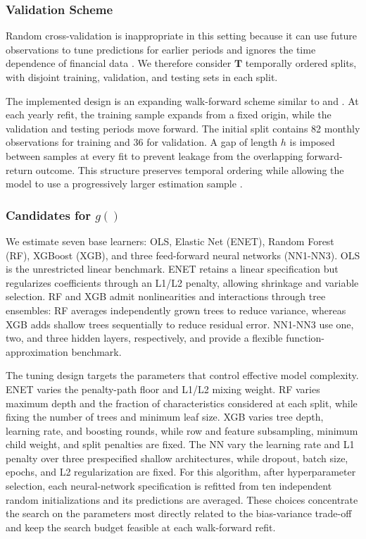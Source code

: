 \documentclass[preprint,12pt,authoryear]{elsarticle}
\begin{document}
\subsubsection{Validation Scheme} \label{valshceme}
Random cross-validation is inappropriate in this setting because it can use future observations to tune predictions for earlier periods and ignores the time dependence of financial data \citep{schnaubelt2019, bergmeiretal2018}. We therefore consider $\mathbf{T}$ temporally ordered splits, with disjoint training, validation, and testing sets in each split.

The implemented design is an expanding walk-forward scheme similar to \citet{hanauerkalsbach2023} and \citet{gukellyxiu2020}. At each yearly refit, the training sample expands from a fixed origin, while the validation and testing periods move forward. The initial split contains 82 monthly observations for training and 36 for validation. A gap of length $h$ is imposed between samples at every fit to prevent leakage from the overlapping forward-return outcome. This structure preserves temporal ordering while allowing the model to use a progressively larger estimation sample \citep{cerqueiraetal2017, kellyxiu2023, tashman2000}.

\subsubsection{Candidates for $g()$}

We estimate seven base learners: OLS, Elastic Net (ENET), Random Forest (RF), XGBoost (XGB), and three feed-forward neural networks (NN1-NN3). OLS is the unrestricted linear benchmark. ENET retains a linear specification but regularizes coefficients through an L1/L2 penalty, allowing shrinkage and variable selection. RF and XGB admit nonlinearities and interactions through tree ensembles: RF averages independently grown trees to reduce variance, whereas XGB adds shallow trees sequentially to reduce residual error. NN1-NN3 use one, two, and three hidden layers, respectively, and provide a flexible function-approximation benchmark.

The tuning design targets the parameters that control effective model complexity. ENET varies the penalty-path floor and L1/L2 mixing weight. RF varies maximum depth and the fraction of characteristics considered at each split, while fixing the number of trees and minimum leaf size. XGB varies tree depth, learning rate, and boosting rounds, while row and feature subsampling, minimum child weight, and split penalties are fixed. The NN vary the learning rate and L1 penalty over three prespecified shallow architectures, while dropout, batch size, epochs, and L2 regularization are fixed. For this algorithm, after hyperparameter selection, each neural-network specification is refitted from ten independent random initializations and its predictions are averaged. These choices concentrate the search on the parameters most directly related to the bias-variance trade-off and keep the search budget feasible at each walk-forward refit.
\end{document}
